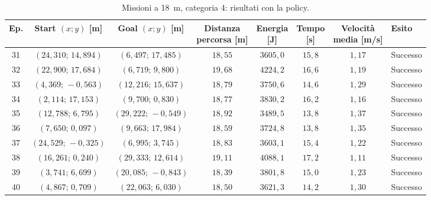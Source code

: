 \begin{table}[H]
\centering
\caption{Missioni a 18~m, categoria 4: risultati con la policy.}
\label{tab:big-map-18m-cat4}
\begingroup
\fontsize{9}{11}\selectfont
\setlength{\tabcolsep}{2.5pt}
\renewcommand{\arraystretch}{1.2}
\begin{tabular}{@{}c cc cccc l@{}}
\toprule
Ep. & \shortstack{Start $(x;y)$\\{}[m]} & \shortstack{Goal $(x;y)$\\{}[m]} & \shortstack{Distanza\\percorsa [m]} & \shortstack{Energia\\{}[J]} & \shortstack{Tempo\\{}[s]} & \shortstack{Velocità\\media [m/s]} & Esito \\
\midrule
31 & $(24{,}310;\,14{,}894)$ & $(6{,}497;\,17{,}485)$ & $18{,}55$ & $3605{,}0$ & $15{,}8$ & $1{,}17$ & Successo \\
32 & $(22{,}900;\,17{,}684)$ & $(6{,}719;\,9{,}800)$ & $19{,}68$ & $4224{,}2$ & $16{,}6$ & $1{,}19$ & Successo \\
33 & $(4{,}369;\,-0{,}563)$ & $(12{,}216;\,15{,}637)$ & $18{,}79$ & $3750{,}6$ & $14{,}6$ & $1{,}29$ & Successo \\
34 & $(2{,}114;\,17{,}153)$ & $(9{,}700;\,0{,}830)$ & $18{,}77$ & $3830{,}2$ & $16{,}2$ & $1{,}16$ & Successo \\
35 & $(12{,}788;\,6{,}795)$ & $(29{,}222;\,-0{,}549)$ & $18{,}92$ & $3489{,}5$ & $13{,}8$ & $1{,}37$ & Successo \\
36 & $(7{,}650;\,0{,}097)$ & $(9{,}663;\,17{,}984)$ & $18{,}59$ & $3724{,}8$ & $13{,}8$ & $1{,}35$ & Successo \\
37 & $(24{,}529;\,-0{,}325)$ & $(6{,}995;\,3{,}745)$ & $18{,}83$ & $3603{,}1$ & $15{,}4$ & $1{,}22$ & Successo \\
38 & $(16{,}261;\,0{,}240)$ & $(29{,}333;\,12{,}614)$ & $19{,}11$ & $4088{,}1$ & $17{,}2$ & $1{,}11$ & Successo \\
39 & $(3{,}741;\,6{,}699)$ & $(20{,}085;\,-0{,}843)$ & $18{,}39$ & $3801{,}8$ & $15{,}0$ & $1{,}23$ & Successo \\
40 & $(4{,}867;\,0{,}709)$ & $(22{,}063;\,6{,}030)$ & $18{,}50$ & $3621{,}3$ & $14{,}2$ & $1{,}30$ & Successo \\
\bottomrule
\end{tabular}
\endgroup
\end{table}
